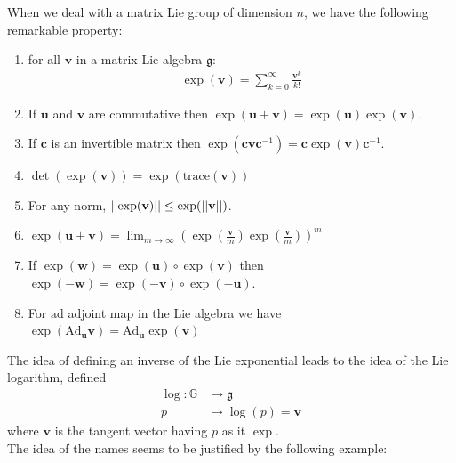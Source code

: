 When we deal with a matrix Lie group of dimension $n$, we have the following remarkable property:
\begin{enumerate}
	\item for all $\mathbf{v}$ in a matrix Lie algebra $\mathfrak{g}$:
	\begin{align*}
	\exp(\mathbf{v}) = \sum_{k=0}^{\infty} \frac{\mathbf{v}^{k}}{k!}
	\end{align*}
	\item If $\mathbf{u}$ and $\mathbf{v}$ are commutative then $\exp(\mathbf{u} + \mathbf{v}) = \exp(\mathbf{u})\exp(\mathbf{v})$.
	\item If $\mathbf{c}$ is an invertible matrix then $\exp(\mathbf{c}\mathbf{v}\mathbf{c}^{-1}) = \mathbf{c}\exp(\mathbf{v})\mathbf{c}^{-1}$.
	\item $\det(\exp(\mathbf{v})) = \exp(\text{trace}(\mathbf{v}))$
	\item For any norm, $\vert\lvert \exp(\mathbf{v}) \rvert\vert \leq \exp(\vert\lvert \mathbf{v} \rvert\vert)$.
	\item  $\exp(\mathbf{u} + \mathbf{v}) =\lim_{m\rightarrow \infty} (\exp(\frac{\mathbf{v}}{m})\exp(\frac{\mathbf{v}}{m}))^{m}$
	\item If $\exp(\mathbf{w}) = \exp(\mathbf{u}) \circ \exp(\mathbf{v})$ then $\exp(\mathbf{-w}) = \exp(\mathbf{-v}) \circ \exp(\mathbf{-u})$.
	\item For $\text{ad}$ adjoint map in the Lie algebra we have $ \exp(\text{Ad}_{\mathbf{u}}\mathbf{v} ) = \text{Ad}_{\mathbf{u}}\exp(\mathbf{v})$
\end{enumerate}
The idea of defining an inverse of the Lie exponential leads to the idea of the Lie logarithm, defined
\begin{align*}
\log : \mathbb{G} & \longrightarrow \mathfrak{g} \\
p &\longmapsto \log (p)  =  \mathbf{v}   
\end{align*}
where $\mathbf{v}  $ is the tangent vector having $p$ as it $\exp$.\\
The idea of the names seems to be justified by the following example:
